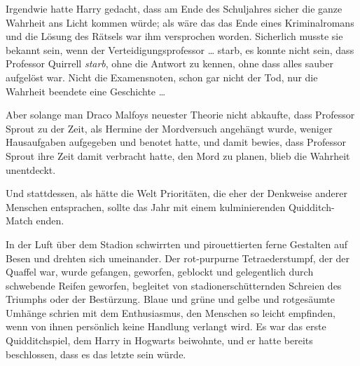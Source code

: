 Irgendwie hatte Harry gedacht, dass am Ende des Schuljahres sicher die ganze Wahrheit ans Licht kommen würde; als wäre das das Ende eines Kriminalromans und die Lösung des Rätsels war ihm versprochen worden. Sicherlich musste sie bekannt sein, wenn der Verteidigungsprofessor … starb, es konnte nicht sein, dass Professor Quirrell \emph{starb}, ohne die Antwort zu kennen, ohne dass alles sauber aufgelöst war. Nicht die Examensnoten, schon gar nicht der Tod, nur die Wahrheit beendete eine Geschichte …

Aber solange man Draco Malfoys neuester Theorie nicht abkaufte, dass Professor Sprout zu der Zeit, als Hermine der Mordversuch angehängt wurde, weniger Hausaufgaben aufgegeben und benotet hatte, und damit bewies, dass Professor Sprout ihre Zeit damit verbracht hatte, den Mord zu planen, blieb die Wahrheit unentdeckt.

Und stattdessen, als hätte die Welt Prioritäten, die eher der Denkweise anderer Menschen entsprachen, sollte das Jahr mit einem kulminierenden Quidditch-Match enden.

\later

In der Luft über dem Stadion schwirrten und pirouettierten ferne Gestalten auf Besen und drehten sich umeinander. Der rot-purpurne Tetraederstumpf, der der Quaffel war, wurde gefangen, geworfen, geblockt und gelegentlich durch schwebende Reifen geworfen, begleitet von stadionerschütternden Schreien des Triumphs oder der Bestürzung. Blaue und grüne und gelbe und rotgesäumte Umhänge schrien mit dem Enthusiasmus, den Menschen so leicht empfinden, wenn von ihnen persönlich keine Handlung verlangt wird. Es war das erste Quidditchspiel, dem Harry in Hogwarts beiwohnte, und er hatte bereits beschlossen, dass es das letzte sein würde.

